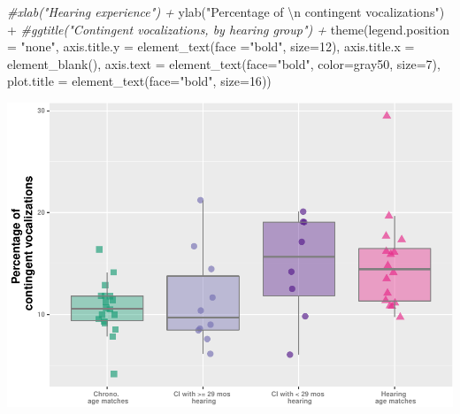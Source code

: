 \documentclass[
]{article}
\newenvironment{Shaded}{\begin{snugshade}}{\end{snugshade}}
\newcommand{\AttributeTok}[1]{\textcolor[rgb]{0.77,0.63,0.00}{#1}}
\newcommand{\CommentTok}[1]{\textcolor[rgb]{0.56,0.35,0.01}{\textit{#1}}}
\newcommand{\DecValTok}[1]{\textcolor[rgb]{0.00,0.00,0.81}{#1}}
\newcommand{\FunctionTok}[1]{\textcolor[rgb]{0.00,0.00,0.00}{#1}}
\newcommand{\NormalTok}[1]{#1}
\newcommand{\SpecialCharTok}[1]{\textcolor[rgb]{0.00,0.00,0.00}{#1}}
\newcommand{\StringTok}[1]{\textcolor[rgb]{0.31,0.60,0.02}{#1}}
\begin{document}
\begin{Shaded}
\begin{Highlighting}[]
  \CommentTok{\#xlab("Hearing experience") +}
  \FunctionTok{ylab}\NormalTok{(}\StringTok{"Percentage of }\SpecialCharTok{\textbackslash{}n}\StringTok{ contingent vocalizations"}\NormalTok{) }\SpecialCharTok{+} 
  \CommentTok{\#ggtitle("Contingent vocalizations, by hearing group") + }
  \FunctionTok{theme}\NormalTok{(}\AttributeTok{legend.position =} \StringTok{"none"}\NormalTok{,}
        \AttributeTok{axis.title.y =} \FunctionTok{element\_text}\NormalTok{(}\AttributeTok{face =}\StringTok{"bold"}\NormalTok{, }\AttributeTok{size=}\DecValTok{12}\NormalTok{),}
        \AttributeTok{axis.title.x =} \FunctionTok{element\_blank}\NormalTok{(),}
        \AttributeTok{axis.text =} \FunctionTok{element\_text}\NormalTok{(}\AttributeTok{face=}\StringTok{"bold"}\NormalTok{, }\AttributeTok{color=}\StringTok{\textquotesingle{}gray50\textquotesingle{}}\NormalTok{, }\AttributeTok{size=}\DecValTok{7}\NormalTok{),}
        \AttributeTok{plot.title =} \FunctionTok{element\_text}\NormalTok{(}\AttributeTok{face=}\StringTok{"bold"}\NormalTok{, }\AttributeTok{size=}\DecValTok{16}\NormalTok{))}
\end{Highlighting}
\end{Shaded}

\includegraphics{everyday_CI_files/figure-latex/visualize perc contingent vocs by hearing group-1.pdf}
\end{document}
